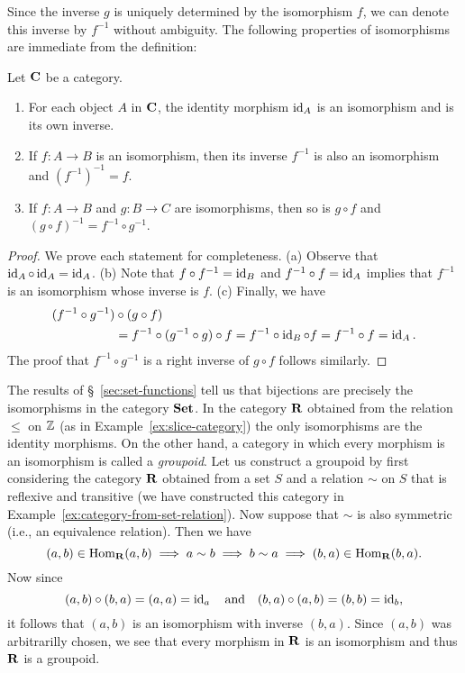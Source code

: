 Since the inverse \(g\) is uniquely determined by the isomorphism \(f\), we can
denote this inverse by \(f^{-1}\) without ambiguity. The following properties of
isomorphisms are immediate from the definition:

\begin{theorem}
    Let \(\mathbf{C}\) be a category.
    \begin{enumerate}[label=(\alph*), itemsep=0pt]
        \item For each object \(A\) in \(\mathbf{C}\), the identity morphism
        \(\operatorname{id}_A\) is an isomorphism and is its own inverse.
        \item If \(f: A \to B\) is an isomorphism, then its inverse \(f^{-1}\)
        is also an isomorphism and \((f^{-1})^{-1} = f\).
        \item If \(f : A \to B\) and \(g : B \to C\) are isomorphisms, then so
        is \(g \circ f\) and \((g \circ f)^{-1} = f^{-1} \circ g^{-1}\).
    \end{enumerate}
\end{theorem}

\begin{proof}
    We prove each statement for completeness. (a) Observe that \(\operatorname{id}_A \circ
    \operatorname{id}_A = \operatorname{id}_A\). (b) Note that \(f \circ f^{-1} = \operatorname{id}_B\) and \(f^{-1} \circ
    f = \operatorname{id}_A\) implies that \(f^{-1}\) is an isomorphism whose inverse is
    \(f\). (c) Finally, we have
    \begin{align*}
        (f^{-1} \circ g^{-1}) &\circ (g \circ f)\\
        &= f^{-1} \circ (g^{-1} \circ g) \circ f = f^{-1} \circ \operatorname{id}_B \circ f = f^{-1} \circ f = \operatorname{id}_A.
    \end{align*}
    The proof that \(f^{-1} \circ g^{-1}\) is a right inverse of \(g \circ f\)
    follows similarly.
\end{proof}

The results of \S~\ref{sec:set-functions} tell us that bijections are precisely
the isomorphisms in the category \(\mathbf{Set}\). In the category \(\mathbf{R}\) obtained
from the relation \(\leq\) on \(\mathbb{Z}\) (as in Example~\ref{ex:slice-category}) the
only isomorphisms are the identity morphisms. On the other hand, a category in
which every morphism is an isomorphism is called a \emph{groupoid}. Let us
construct a groupoid by first considering the category \(\mathbf{R}\) obtained
from a set \(S\) and a relation \(\sim\) on \(S\) that is reflexive and
transitive (we have constructed this category in
Example~\ref{ex:category-from-set-relation}). Now suppose that \(\sim\) is also
symmetric (i.e., an equivalence relation). Then we have
\[
    (a, b) \in \operatorname{Hom}_{\mathbf{R}}(a, b) \implies a \sim b \implies b \sim a \implies (b, a) \in \operatorname{Hom}_{\mathbf{R}}(b, a).
\]
Now since
\[
    (a, b) \circ (b, a) = (a, a) = \operatorname{id}_a \quad \text{and} \quad (b, a) \circ (a, b) = (b, b) = \operatorname{id}_b,
\]
it follows that \((a, b)\) is an isomorphism with inverse \((b, a)\). Since
\((a, b)\) was arbitrarilly chosen, we see that every morphism in \(\mathbf{R}\)
is an isomorphism and thus \(\mathbf{R}\) is a groupoid.

